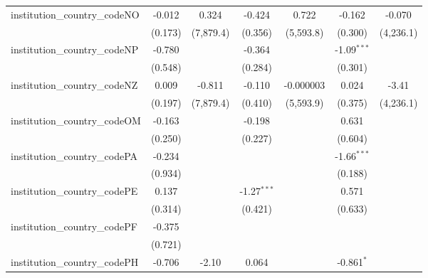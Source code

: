 \begin{tabular}{lcccccc}
   institution\_country\_codeNO          & -0.012         & 0.324         & -0.424         & 0.722         & -0.162         & -0.070\\   
                                         & (0.173)        & (7,879.4)     & (0.356)        & (5,593.8)     & (0.300)        & (4,236.1)\\   
   institution\_country\_codeNP          & -0.780         &               & -0.364         &               & -1.09$^{***}$  &   \\   
                                         & (0.548)        &               & (0.284)        &               & (0.301)        &   \\   
   institution\_country\_codeNZ          & 0.009          & -0.811        & -0.110         & -0.000003     & 0.024          & -3.41\\   
                                         & (0.197)        & (7,879.4)     & (0.410)        & (5,593.9)     & (0.375)        & (4,236.1)\\   
   institution\_country\_codeOM          & -0.163         &               & -0.198         &               & 0.631          &   \\   
                                         & (0.250)        &               & (0.227)        &               & (0.604)        &   \\   
   institution\_country\_codePA          & -0.234         &               &                &               & -1.66$^{***}$  &   \\   
                                         & (0.934)        &               &                &               & (0.188)        &   \\   
   institution\_country\_codePE          & 0.137          &               & -1.27$^{***}$  &               & 0.571          &   \\   
                                         & (0.314)        &               & (0.421)        &               & (0.633)        &   \\   
   institution\_country\_codePF          & -0.375         &               &                &               &                &   \\   
                                         & (0.721)        &               &                &               &                &   \\   
   institution\_country\_codePH          & -0.706         & -2.10         & 0.064          &               & -0.861$^{*}$   &   \\   

\end{tabular}
